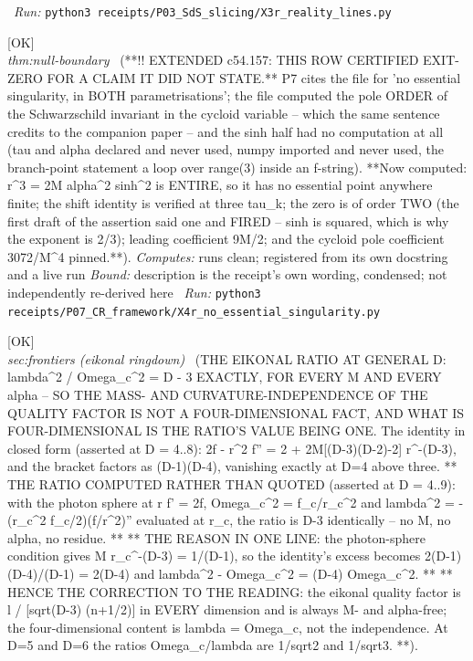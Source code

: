 \begin{description}
\ \emph{Run:} \texttt{python3 receipts/P03\_SdS\_slicing/X3r\_reality\_lines.py}
\item[\label{rcpt:X4r_no_essential_singularity}\texttt{X4r\_no\_essential\_singularity}]\hfill\textsf{[OK]}\\
\textit{thm:null-boundary} \ (**!! EXTENDED c54.157: THIS ROW CERTIFIED EXIT-ZERO FOR A CLAIM IT DID NOT STATE.** P7 cites the file for 'no essential singularity, in BOTH parametrisations'; the file computed the pole ORDER of the Schwarzschild invariant in the cycloid variable -- which the same sentence credits to the companion paper -- and the sinh half had no computation at all (tau and alpha declared and never used, numpy imported and never used, the branch-point statement a loop over range(3) inside an f-string). **Now computed: r\textasciicircum{}3 = 2M alpha\textasciicircum{}2 sinh\textasciicircum{}2 is ENTIRE, so it has no essential point anywhere finite; the shift identity is verified at three tau\_k; the zero is of order TWO (the first draft of the assertion said one and FIRED -- sinh is squared, which is why the exponent is 2/3); leading coefficient 9M/2; and the cycloid pole coefficient 3072/M\textasciicircum{}4 pinned.**). 
\emph{Computes:} runs clean; registered from its own docstring and a live run
 \emph{Bound:} description is the receipt's own wording, condensed; not independently re-derived here
\ \emph{Run:} \texttt{python3 receipts/P07\_CR\_framework/X4r\_no\_essential\_singularity.py}
\item[\label{rcpt:P07_eikonal_ratio_is_D_minus_three}\texttt{P07\_eikonal\_ratio\_is\_D\_minus\_three}]\hfill\textsf{[OK]}\\
\textit{sec:frontiers (eikonal ringdown)} \ (THE EIKONAL RATIO AT GENERAL D: lambda\textasciicircum{}2 / Omega\_c\textasciicircum{}2 = D - 3 EXACTLY, FOR EVERY M AND EVERY alpha -- SO THE MASS- AND CURVATURE-INDEPENDENCE OF THE QUALITY FACTOR IS NOT A FOUR-DIMENSIONAL FACT, AND WHAT IS FOUR-DIMENSIONAL IS THE RATIO'S VALUE BEING ONE. The identity in closed form (asserted at D = 4..8): 2f - r\textasciicircum{}2 f'' = 2 + 2M[(D-3)(D-2)-2] r\textasciicircum{}-(D-3), and the bracket factors as (D-1)(D-4), vanishing exactly at D=4 above three. ** THE RATIO COMPUTED RATHER THAN QUOTED (asserted at D = 4..9): with the photon sphere at r f' = 2f, Omega\_c\textasciicircum{}2 = f\_c/r\_c\textasciicircum{}2 and lambda\textasciicircum{}2 = -(r\_c\textasciicircum{}2 f\_c/2)(f/r\textasciicircum{}2)'' evaluated at r\_c, the ratio is D-3 identically -- no M, no alpha, no residue. ** ** THE REASON IN ONE LINE: the photon-sphere condition gives M r\_c\textasciicircum{}-(D-3) = 1/(D-1), so the identity's excess becomes 2(D-1)(D-4)/(D-1) = 2(D-4) and lambda\textasciicircum{}2 - Omega\_c\textasciicircum{}2 = (D-4) Omega\_c\textasciicircum{}2. ** ** HENCE THE CORRECTION TO THE READING: the eikonal quality factor is l / [sqrt(D-3) (n+1/2)] in EVERY dimension and is always M- and alpha-free; the four-dimensional content is lambda = Omega\_c, not the independence. At D=5 and D=6 the ratios Omega\_c/lambda are 1/sqrt2 and 1/sqrt3. **). 

\end{description}
